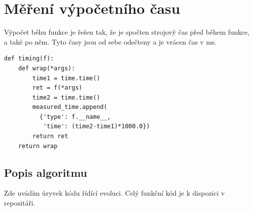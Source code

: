 \documentclass[a4paper,10pt,twocolumn]{article}
\begin{document}
\section{Měření výpočetního času}
Výpočet běhu funkce je řešen tak, že je spočten strojový čas před během funkce, a také po něm. Tyto časy jsou od sebe odečteny a je vrácen čas v ms.

   \begin{verbatim}
def timing(f):
    def wrap(*args):
        time1 = time.time()
        ret = f(*args)
        time2 = time.time()
        measured_time.append(
          {'type': f.__name__,
           'time': (time2-time1)*1000.0})
        return ret
    return wrap
   \end{verbatim}


\subsection{Popis algoritmu}

Zde uvádím úryvek kódu řídící evoluci. Celý funkční kód je k dispozici v repozitáři.
\end{document}
